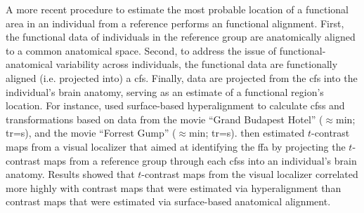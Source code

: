 
A more recent procedure \citep[e.g., ][]{jiahui2020predicting,
guntupalli2016model, haxby2011common} to estimate the most probable location of
a functional area in an individual from a reference performs an functional
alignment.
First, the functional data of individuals in the reference group are
anatomically aligned to a common anatomical space.
%
Second, to address the issue of functional-anatomical variability across
individuals, the functional data are functionally aligned (i.e. projected into)
a \ac{cfs}.
%
Finally, data are projected from the \ac{cfs} into the individual's
brain anatomy, serving as an estimate of a functional region's location.
For instance, \citet{jiahui2020predicting} used surface-based hyperalignment to
calculate \acp{cfs} and transformations based on data from
%
the movie ``Grand Budapest Hotel'' ($\approx$\unit[50]{min}; \ac{tr}=\unit[1]{s}),
and
%
the movie ``Forrest Gump'' ($\approx$\unit[120]{min}; \ac{tr}=\unit[2]{s}).
%
\citet{jiahui2020predicting} then estimated $t$-contrast maps from a visual
localizer that aimed at identifying the \ac{ffa} by projecting the $t$-contrast
maps from a reference group through each \acp{cfs} into an individual's brain
anatomy.
%
Results showed that $t$-contrast maps from the visual localizer correlated more
highly with contrast maps that were estimated via hyperalignment than contrast
maps that were estimated via surface-based anatomical alignment.

